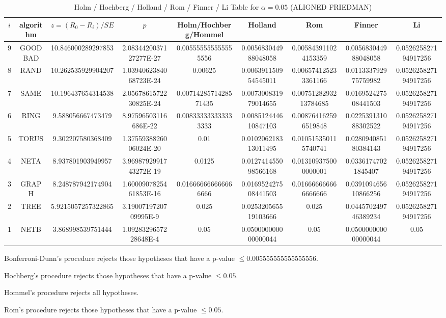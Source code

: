\documentclass[a4paper,10pt]{article}
\begin{document}
\begin{landscape}
\newpage

\begin{table}[!htp]
\centering\scriptsize
\caption{Holm / Hochberg / Holland / Rom / Finner / Li Table for $\alpha=0.05$ (ALIGNED FRIEDMAN)}
\begin{tabular}{ccccccccc}
$i$&algorithm&$z=(R_0 - R_i)/SE$&$p$&Holm/Hochberg/Hommel&Holland&Rom&Finner&Li\\
\hline
9& GOODBAD&10.846000289297853&2.0834420037127277E-27&0.005555555555555556&0.005683044988048058&0.005843911024153359&0.005683044988048058&0.052625827194917256\\
8& RAND&10.262535929904207&1.0394062384068723E-24&0.00625&0.006391150954545011&0.006574125233361166&0.011333792975759982&0.052625827194917256\\
7& SAME&10.196437654314538&2.0567861572230825E-24&0.0071428571428571435&0.007300831979014655&0.0075128293213784685&0.016952427508441503&0.052625827194917256\\
6& RING&9.588056667473479&8.97596503116686E-22&0.008333333333333333&0.008512444610847103&0.008764162596519848&0.022539131088302522&0.052625827194917256\\
5& TORUS&9.302207580368409&1.3755938826006024E-20&0.01&0.010206218313011495&0.010515350115740741&0.028094085180384143&0.052625827194917256\\
4& NETA&8.937801903949957&3.9698792991743272E-19&0.0125&0.012741455098566168&0.013109375000000001&0.03361747021845407&0.052625827194917256\\
3& GRAPH&8.248787942174904&1.6000907825461853E-16&0.016666666666666666&0.016952427508441503&0.016666666666666666&0.039109465610866256&0.052625827194917256\\
2& TREE&5.9215057257322865&3.1900719720709995E-9&0.025&0.025320565519103666&0.025&0.044570249746389234&0.052625827194917256\\
1& NETB&3.868998539751444&1.0928329657228648E-4&0.05&0.050000000000000044&0.05&0.050000000000000044&0.05\\
\hline
\end{tabular}
\end{table}
Bonferroni-Dunn's procedure rejects those hypotheses that have a p-value $\le0.005555555555555556$.


Hochberg's procedure rejects those hypotheses that have a p-value $\le0.05$.


Hommel's procedure rejects all hypotheses.


Rom's procedure rejects those hypotheses that have a p-value $\le0.05$.



\end{landscape}
\end{document}
